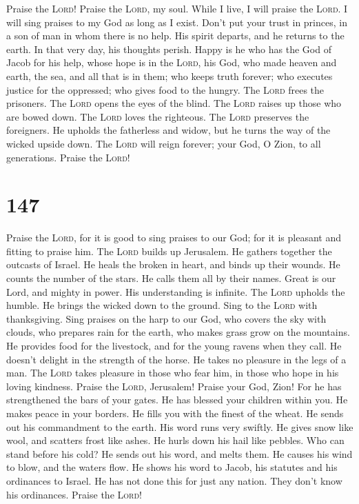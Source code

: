  Praise the \textsc{Lord}! Praise the \textsc{Lord}, my
soul.  While I live, I will praise the \textsc{Lord}. I
will sing praises to my God as long as I exist.  Don't put
your trust in princes, in a son of man in whom there is no help.
 His spirit departs, and he returns to the earth. In that
very day, his thoughts perish.  Happy is he who has the
God of Jacob for his help, whose hope is in the \textsc{Lord}, his God,
 who made heaven and earth, the sea, and all that is in
them; who keeps truth forever;  who executes justice for
the oppressed; who gives food to the hungry. The \textsc{Lord} frees the
prisoners.  The \textsc{Lord} opens the eyes of the blind.
The \textsc{Lord} raises up those who are bowed down. The \textsc{Lord}
loves the righteous.  The \textsc{Lord} preserves the
foreigners. He upholds the fatherless and widow, but he turns the way of
the wicked upside down.  The \textsc{Lord} will reign
forever; your God, O Zion, to all generations. Praise the \textsc{Lord}!

\hypertarget{section-146}{%
\section{147}\label{section-146}}

 Praise the \textsc{Lord}, for it is good to sing praises
to our God; for it is pleasant and fitting to praise him. 
The \textsc{Lord} builds up Jerusalem. He gathers together the outcasts
of Israel.  He heals the broken in heart, and binds up
their wounds.  He counts the number of the stars. He calls
them all by their names.  Great is our Lord, and mighty in
power. His understanding is infinite.  The \textsc{Lord}
upholds the humble. He brings the wicked down to the ground.
 Sing to the \textsc{Lord} with thanksgiving. Sing praises
on the harp to our God,  who covers the sky with clouds,
who prepares rain for the earth, who makes grass grow on the mountains.
 He provides food for the livestock, and for the young
ravens when they call.  He doesn't delight in the
strength of the horse. He takes no pleasure in the legs of a man.
 The \textsc{Lord} takes pleasure in those who fear him,
in those who hope in his loving kindness.  Praise the
\textsc{Lord}, Jerusalem! Praise your God, Zion!  For he
has strengthened the bars of your gates. He has blessed your children
within you.  He makes peace in your borders. He fills you
with the finest of the wheat.  He sends out his
commandment to the earth. His word runs very swiftly.  He
gives snow like wool, and scatters frost like ashes.  He
hurls down his hail like pebbles. Who can stand before his cold?
 He sends out his word, and melts them. He causes his
wind to blow, and the waters flow.  He shows his word to
Jacob, his statutes and his ordinances to Israel.  He has
not done this for just any nation. They don't know his ordinances.
Praise the \textsc{Lord}!


